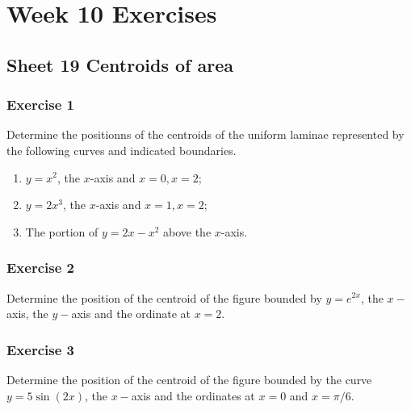 \documentclass[
  11pt,
  oneside]{book}
\providecommand{\tightlist}{%
  \setlength{\itemsep}{0pt}\setlength{\parskip}{0pt}}
\newcommand{\slide}{}
\theoremstyle{definition}
\theoremstyle{definition}
\theoremstyle{definition}
\theoremstyle{definition}
\theoremstyle{remark}
\begin{document}
\chapter*{Week 10 Exercises}\label{week-10-exercises}

\section{Sheet 19 Centroids of area}\label{sheet-19-centroids-of-area}

\slide

\subsection*{Exercise 1}\label{exercise-1-10}

Determine the positionns of the centroids of the uniform laminae represented by the following curves and indicated boundaries.

\begin{enumerate}
\def\labelenumi{\roman{enumi}.}
\tightlist
\item
  \(y=x^2\), the \(x\)-axis and \(x=0, x=2\);
\item
  \(y=2x^3\), the \(x\)-axis and \(x=1, x=2\);
\item
  The portion of \(y=2x-x^2\) above the \(x\)-axis.
\end{enumerate}

\slide

\subsection*{Exercise 2}\label{exercise-2-10}

Determine the position of the centroid of the figure bounded by \(y = e^{2x}\), the \(x-\)axis, the \(y-\)axis and the ordinate at \(x = 2\).

\slide

\subsection*{Exercise 3}\label{exercise-3-8}

Determine the position of the centroid of the figure bounded by the curve \(y = 5\sin(2x)\), the \(x-\)axis and the ordinates at \(x = 0\) and \(x = \pi/6\).
\end{document}
